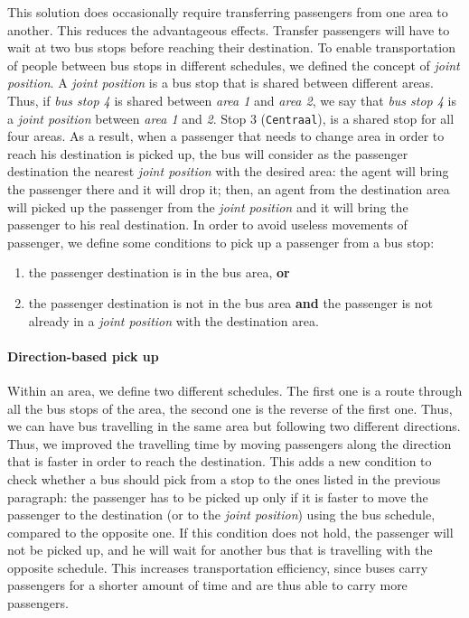 \documentclass{article}
\begin{document}
This solution does occasionally require transferring passengers from one area to another. This reduces the advantageous effects. Transfer passengers will have to wait at two bus stops before reaching their destination. To enable transportation of people between bus stops in different schedules, we defined the concept of \textit{joint position}. A \textit{joint position} is a bus stop that is shared between different areas. Thus, if \textit{bus stop 4} is shared between \textit{area 1} and \textit{area 2}, we say that \textit{bus stop 4} is a \textit{joint position}  between \textit{area 1} and \textit{2}. Stop 3 (\texttt{Centraal}), is a shared stop for all four areas. As a result, when a passenger that needs to change area in order to reach his destination is picked up, the bus will consider as the passenger destination the nearest \textit{joint position} with the desired area: the agent will bring the passenger there and it will drop it; then, an agent from the destination area will picked up the passenger from the \textit{joint position} and it will bring the passenger to his real destination. In order to avoid useless movements of passenger, we define some conditions to pick up a passenger from a bus stop:

\begin{enumerate}
\item the passenger destination is in the bus area, \textbf{or}
\item the passenger destination is not in the bus area \textbf{and} the passenger is not already in a \textit{joint position} with the destination area.
\end{enumerate}


\paragraph{Direction-based pick up}
Within an area, we define two different schedules. The first one is a route through all the bus stops of the area, the second one is the reverse of the first one. Thus, we can have bus travelling in the same area but following two different directions. Thus, we improved the travelling time by moving passengers along the direction that is faster in order to reach the destination. This adds a new condition to check whether a bus should pick from a stop to the ones listed in the previous paragraph: the passenger has to be picked up only if it is faster to move the passenger to the destination (or to the \textit{joint position}) using the bus schedule, compared to the opposite one. If this condition does not hold, the passenger will not be picked up, and he will wait for another bus that is travelling with the opposite schedule. This increases transportation efficiency, since buses carry passengers for a shorter amount of time and are thus able to carry more passengers. 
\end{document}
